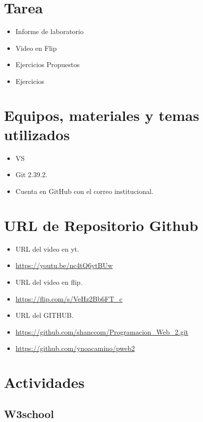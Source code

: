 \documentclass{article}
\begin{document}
	\section{Tarea}
	\begin{itemize}		
		\item Informe de laboratorio
            \item Video en Flip
		\item Ejercicios Propuestos
            \item Ejercicios
        
	\end{itemize}
		
	\section{Equipos, materiales y temas utilizados}
	\begin{itemize}
		\item VS
		\item Git 2.39.2.
		\item Cuenta en GitHub con el correo institucional.
	\end{itemize}
    \clearpage
    
	\section{URL de Repositorio Github}
	\begin{itemize}
        \item URL del video en yt.
		\item \url{https://youtu.be/nc4tQ6ytBUw}
        \item URL del video en flip.
		\item \url{https://flip.com/s/VeHz2Bb6FT_c}
        \item URL del GITHUB.
            \item \url{https://github.com/shanccom/Programacion_Web_2.git}
		\item \url{https://github.com/ynoacamino/pweb2}
	\end{itemize}
	
	\section{Actividades}
	\subsection{W3school}
\end{document}

